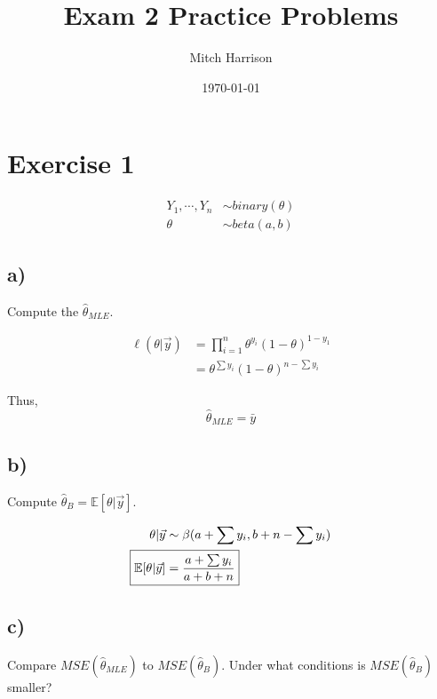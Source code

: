 \documentclass[titlepage, 12pt, leqno]{article}
\title{\Huge{Exam 2 Practice Problems}}
\author{\large{Mitch Harrison}}
\date{\today}
\begin{document}
\setlength{\parskip}{1\baselineskip}
\setlength{\parindent}{15pt}
\maketitle
\tableofcontents
\newpage


\section{Exercise 1}

\begin{align*}
    Y_{1}, \cdots ,Y_{n} & \sim binary(\theta) \\
    \theta & \sim beta(a,b)
\end{align*}

\subsection{a)}
\begin{ex}
    Compute the $\hat \theta_{MLE}$.
\end{ex}

\begin{align*}
    \ell(\theta|\vec y) &= \prod_{i=1}^{n}\theta^{y_{i}}(1-\theta)^{1-y_{1}}\\
                        &= \theta^{\sum y_{i}}(1-\theta)^{n-\sum y_{i}}
\end{align*}

Thus,
\[
\boxed{\hat \theta_{MLE} = \bar y} 
\]

\subsection{b)}
\begin{ex}
    Compute $\hat \theta_{B}= \mathbb{E}[\theta|\vec y]$.
\end{ex}
\begin{align*}
    \theta|\vec y & \sim \beta(a + \sum y_{i}, b + n - \sum y_{i})\\
    \Aboxed{\mathbb{E}[\theta|\vec y] &= \frac{a + \sum y_{i}}{a + b + n}}
\end{align*}

\subsection{c)}
\begin{ex}
    Compare $MSE(\hat \theta_{MLE})$ to $MSE(\hat \theta_{B})$. Under what
    conditions is $MSE(\hat \theta_{B})$ smaller?
\end{ex}
\end{document}
